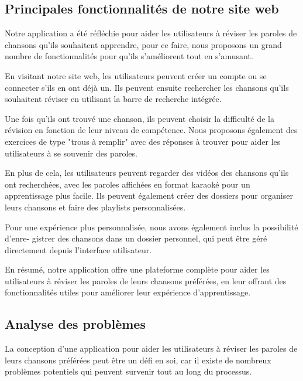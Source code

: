 \documentclass[12pt,french]{article}
\begin{document}
\subsection{Principales fonctionnalités de notre site web}

Notre application a été réfléchie pour aider les utilisateurs à réviser les paroles de chansons qu'ils souhaitent apprendre, pour ce faire, nous proposons un grand nombre de fonctionnalités pour qu'ils s'améliorent tout en s'amusant.
\newline 

En visitant notre site web, les utilisateurs peuvent créer un compte ou se connecter s'ils en ont déjà un. Ils peuvent ensuite rechercher les chansons qu'ils souhaitent réviser en utilisant la barre de recherche intégrée.
\newline 

Une fois qu'ils ont trouvé une chanson, ils peuvent choisir la difficulté de la révision en fonction de leur niveau de compétence. Nous proposons également des exercices de type "trous à remplir" avec des réponses à trouver pour aider les utilisateurs à se souvenir des paroles.
\newline 

En plus de cela, les utilisateurs peuvent regarder des vidéos des chansons qu'ils ont recherchées, avec les paroles affichées en format karaoké pour un apprentissage plus facile. Ils peuvent également créer des dossiers pour organiser leurs chansons et faire des playlists personnalisées.
\newline 

Pour une expérience plus personnalisée, nous avons également inclus la possibilité d'enre- gistrer des chansons dans un dossier personnel, qui peut être géré directement depuis l'interface utilisateur.
\newline 

En résumé, notre application offre une plateforme complète pour aider les utilisateurs à réviser les paroles de leurs chansons préférées, en leur offrant des fonctionnalités utiles pour améliorer leur expérience d'apprentissage.



\subsection{Analyse des problèmes}


La conception d'une application pour aider les utilisateurs à réviser les paroles de leurs chansons préférées peut être un défi en soi, car il existe de nombreux problèmes potentiels qui peuvent survenir tout au long du processus.
\newline
\end{document}

